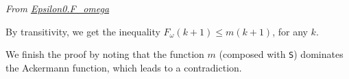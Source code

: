 \emph{From \href{../theories/html/hydras.Epsilon0.F_omega.html}{Epsilon0.F\_omega}}






By transitivity, we get the inequality
$F_\omega(k+1)\leq m(k+1)$, for any $k$.




We finish the proof by noting that the function $m$ (composed with \texttt{S}) dominates the Ackermann function, which leads to a contradiction.









